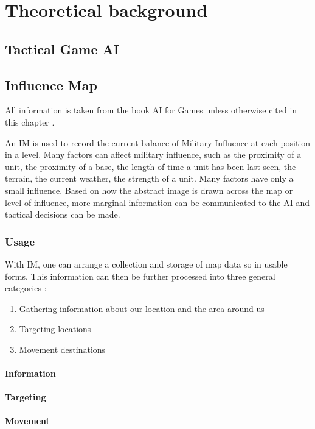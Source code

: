 \documentclass[]{report}
\begin{document}
	\chapter{Theoretical background}
	
	\section{Tactical Game AI}
	
	
	\section{Influence Map}
	All information is taken from the book \ac{AI} for Games unless otherwise cited in this chapter \citep{AIforGamesTactical}.
	
	An \ac{IM} is used to record the current balance of Military Influence at each position in a level. Many factors can affect military influence, such as the proximity of a unit, the proximity of a base, the length of time a unit has been last seen, the terrain, the current weather, the strength of a unit. Many factors have only a small influence. Based on how the abstract image is drawn across the map or level of influence, more marginal information can be communicated to the \ac{AI} and tactical decisions can be made.
	
	\subsection{Usage} \label{usage}
	With \ac{IM}, one can arrange a collection and storage of map data so in usable forms. This information can then be further processed into three general categories \citep{gameAIPro}:
	
	\begin{enumerate}
		\item Gathering information about our location and the area around us
		\item Targeting locations
		\item Movement destinations
	\end{enumerate}
	
	\subsubsection{Information}
	\subsubsection{Targeting}
	\subsubsection{Movement}
	
\end{document}
